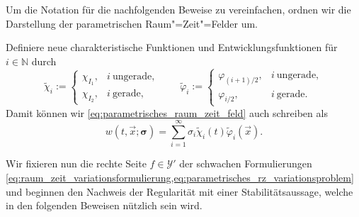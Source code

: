 \documentclass[../main.tex]{subfiles}
\begin{document}
Um die Notation für die nachfolgenden Beweise zu vereinfachen, ordnen wir die Darstellung der parametrischen Raum"=Zeit"=Felder um.
\begin{Bemerkung}
    Definiere neue charakteristische Funktionen und Entwicklungsfunktionen für $i \in \mathbb{N}$ durch
    \begin{equation}
        \tilde{\chi}_{i} := \begin{cases}
            \chi_{I_{1}}, & i~\text{ungerade},\\
            \chi_{I_{2}}, & i~\text{gerade},
        \end{cases} \qquad
        \tilde{\varphi}_{i} := \begin{cases}
            \varphi_{(i+1)/{2}}, & i~\text{ungerade},\\
            \varphi_{i / 2}, & i~\text{gerade}.
        \end{cases}
    \end{equation}
    Damit können wir \cref{eq:parametrisches_raum_zeit_feld} auch schreiben als
    \begin{equation}
        w(t, \vec{x}; \bm \sigma) = \sum_{i = 1}^{\infty} \sigma_{i} \tilde{\chi}_{i}(t) \tilde{\varphi}_{i}(\vec{x}).
    \end{equation}
\end{Bemerkung}

Wir fixieren nun die rechte Seite $f \in \mathcal Y'$ der schwachen Formulierungen \cref{eq:raum_zeit_variationsformulierung,eq:parametrisches_rz_variationsproblem} und beginnen den Nachweis der Regularität mit einer Stabilitätsaussage, welche in den folgenden Beweisen nützlich sein wird.
\end{document}
